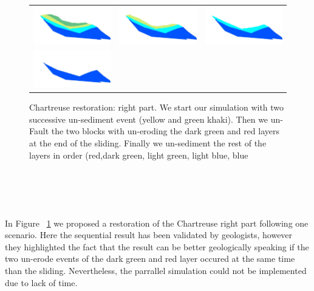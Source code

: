 \documentclass[12pt, a4paper]{report} %
\begin{document}
\begin{center}
\begin{figure}[htb]
\begin{tabular}{@{}ccc@{}}
\includegraphics[width=.34\textwidth]{chartreusedroite6.png}&
\includegraphics[width=.34\textwidth]{chartreusedroite7.png}&
\includegraphics[width=.34\textwidth]{chartreusedroite8.png}\\
\includegraphics[width=.34\textwidth]{chartreusedroite9.png}\\
\end{tabular}
\caption{Chartreuse restoration: right part. We start our simulation with two successive un-sediment event (yellow and green khaki). Then we un-Fault the two blocks with un-eroding the dark green and red layers at the end of the sliding. Finally we un-sediment the rest of the layers in order (red,dark green, light green, light blue, blue}
\label{chartreusedrest}
\end{figure}
\end{center}
\\\\\\\\
In Figure ~\ref{chartreusedrest} we proposed a restoration of the Chartreuse right part following one scenario. Here the sequential result has been validated by geologists, however they highlighted the fact that the result can be better geologically speaking if the two un-erode events of the dark green and red layer occured at the same time than the sliding. Nevertheless, the parrallel simulation could not be implemented due to lack of time.\\\\
\end{document}

